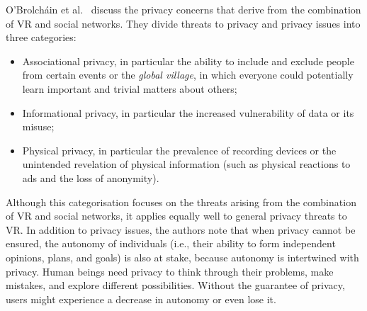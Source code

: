 \documentclass[journal]{IEEEtran}
\begin{document}
O'Brolch\'ain et al.~\cite{obrolchain2016} discuss the privacy concerns that derive from the combination of VR and social networks. They divide threats to privacy and privacy issues into three categories: 
\begin{itemize}
    \item Associational privacy, in particular the ability to include and exclude people from certain events or the \textit{global village}, in which everyone could potentially learn important and trivial matters about others;
    \item Informational privacy, in particular the increased vulnerability of data or its misuse;
    \item Physical privacy, in particular the prevalence of recording devices or the unintended revelation of physical information (such as physical reactions to ads and the loss of anonymity).
\end{itemize}

Although this categorisation focuses on the threats arising from the combination of VR and social networks, it applies equally well to general privacy threats to VR. In addition to privacy issues, the authors note that when privacy cannot be ensured, the autonomy of individuals (i.e., their ability to form independent opinions, plans, and goals) is also at stake, because autonomy is intertwined with privacy. Human beings need privacy to think through their problems, make mistakes, and explore different possibilities. Without the guarantee of privacy, users might experience a decrease in autonomy or even lose it.
\end{document}
